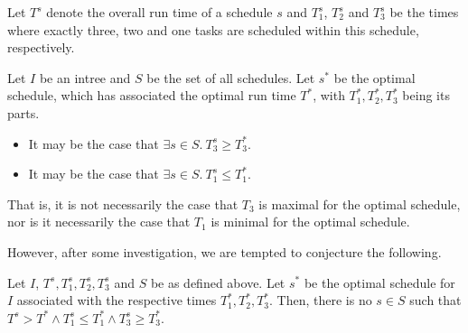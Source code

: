 \begin{corollary}
  Let $T^s$ denote the overall run time of a schedule $s$ and $T_1^s$, $T_2^s$ and $T_3^s$ be the times where exactly three, two and one tasks are scheduled within this schedule, respectively.

  Let $I$ be an intree and $S$ be the set of all schedules. Let $s^*$ be the optimal schedule, which has associated the optimal run time $T^*$, with $T_1^*, T_2^*, T_3^*$ being its parts.
  \begin{itemize}
  \item It may be the case that $\exists s\in S.\  T_3^s \geq T_3^*$.
  \item It may be the case that $\exists s\in S.\  T_1^s \leq T_1^*$.
  \end{itemize}
\end{corollary}

That is, it is not necessarily the case that $T_3$ is maximal for the optimal schedule, nor is it necessarily the case that $T_1$ is minimal for the optimal schedule.

However, after some investigation, we are tempted to conjecture the following.

\begin{conjecture}
  Let $I$, $T^s, T_1^s, T_2^s, T_3^s$ and $S$ be as defined above. Let $s^*$ be the optimal schedule for $I$ associated with the respective times $T_1^*, T_2^*, T_3^*$. Then, there is no $s\in S$ such that $T^s > T^* \wedge T_1^s \leq T_1^* \wedge T_3^s \geq T_3^*$.
\end{conjecture}

